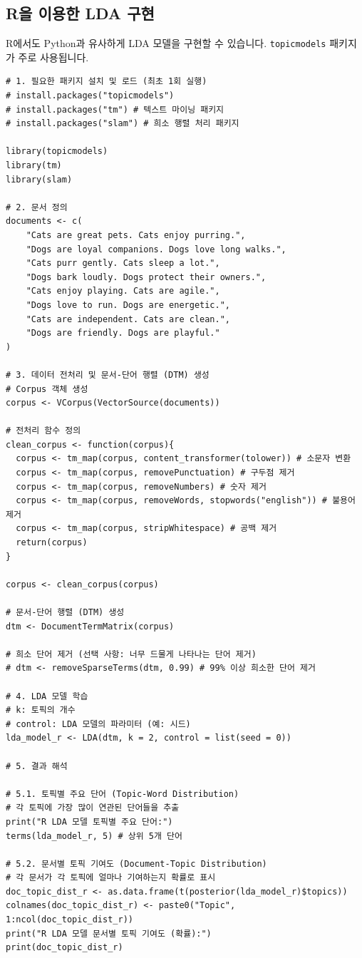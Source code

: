 \documentclass[11pt,a4paper]{article}
\theoremstyle{definition}
\begin{document}
\newpage
\subsection*{R을 이용한 LDA 구현}
R에서도 Python과 유사하게 LDA 모델을 구현할 수 있습니다. \texttt{topicmodels} 패키지가 주로 사용됩니다.

\begin{lstlisting}[caption={R을 이용한 LDA 구현 예시}, label={lst:r_lda}]
# 1. 필요한 패키지 설치 및 로드 (최초 1회 실행)
# install.packages("topicmodels")
# install.packages("tm") # 텍스트 마이닝 패키지
# install.packages("slam") # 희소 행렬 처리 패키지

library(topicmodels)
library(tm)
library(slam)

# 2. 문서 정의
documents <- c(
    "Cats are great pets. Cats enjoy purring.",
    "Dogs are loyal companions. Dogs love long walks.",
    "Cats purr gently. Cats sleep a lot.",
    "Dogs bark loudly. Dogs protect their owners.",
    "Cats enjoy playing. Cats are agile.",
    "Dogs love to run. Dogs are energetic.",
    "Cats are independent. Cats are clean.",
    "Dogs are friendly. Dogs are playful."
)

# 3. 데이터 전처리 및 문서-단어 행렬 (DTM) 생성
# Corpus 객체 생성
corpus <- VCorpus(VectorSource(documents))

# 전처리 함수 정의
clean_corpus <- function(corpus){
  corpus <- tm_map(corpus, content_transformer(tolower)) # 소문자 변환
  corpus <- tm_map(corpus, removePunctuation) # 구두점 제거
  corpus <- tm_map(corpus, removeNumbers) # 숫자 제거
  corpus <- tm_map(corpus, removeWords, stopwords("english")) # 불용어 제거
  corpus <- tm_map(corpus, stripWhitespace) # 공백 제거
  return(corpus)
}

corpus <- clean_corpus(corpus)

# 문서-단어 행렬 (DTM) 생성
dtm <- DocumentTermMatrix(corpus)

# 희소 단어 제거 (선택 사항: 너무 드물게 나타나는 단어 제거)
# dtm <- removeSparseTerms(dtm, 0.99) # 99% 이상 희소한 단어 제거

# 4. LDA 모델 학습
# k: 토픽의 개수
# control: LDA 모델의 파라미터 (예: 시드)
lda_model_r <- LDA(dtm, k = 2, control = list(seed = 0))

# 5. 결과 해석

# 5.1. 토픽별 주요 단어 (Topic-Word Distribution)
# 각 토픽에 가장 많이 연관된 단어들을 추출
print("R LDA 모델 토픽별 주요 단어:")
terms(lda_model_r, 5) # 상위 5개 단어

# 5.2. 문서별 토픽 기여도 (Document-Topic Distribution)
# 각 문서가 각 토픽에 얼마나 기여하는지 확률로 표시
doc_topic_dist_r <- as.data.frame(t(posterior(lda_model_r)$topics))
colnames(doc_topic_dist_r) <- paste0("Topic", 1:ncol(doc_topic_dist_r))
print("R LDA 모델 문서별 토픽 기여도 (확률):")
print(doc_topic_dist_r)


\end{lstlisting}
\end{document}
